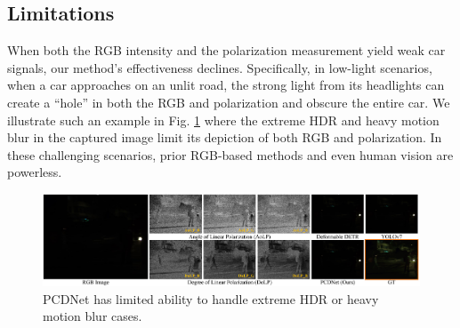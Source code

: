 \subsection{Limitations}

When both the RGB intensity and the polarization measurement yield weak car signals, our method's effectiveness declines. Specifically, in low-light scenarios, when a car approaches on an unlit road, the strong light from its headlights can create a ``hole'' in both the RGB and polarization and obscure the entire car. We illustrate such an example in Fig. \ref{fig:failure} where the extreme HDR and heavy motion blur in the captured image limit its depiction of both RGB and polarization. In these challenging scenarios, prior RGB-based methods and even human vision are powerless.

\begin{figure}[t]
    \centering
    \includegraphics[width=1\linewidth]{figure/failure.pdf}
    \caption{PCDNet has limited ability to handle extreme HDR or heavy motion blur cases.}
    \label{fig:failure}
\end{figure}
